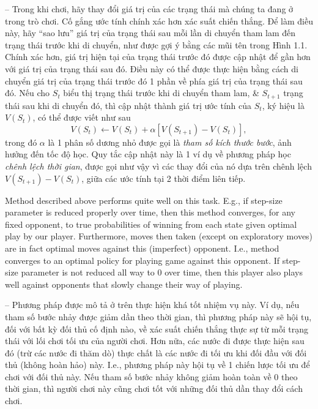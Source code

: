 \documentclass{article}
\begin{document}
\begin{itemize}
\begin{itemize}
        -- Trong khi chơi, hãy thay đổi giá trị của các trạng thái mà chúng ta đang ở trong trò chơi. Cố gắng ước tính chính xác hơn xác suất chiến thắng. Để làm điều này, hãy ``sao lưu'' giá trị của trạng thái sau mỗi lần di chuyển tham lam đến trạng thái trước khi di chuyển, như được gợi ý bằng các mũi tên trong Hình 1.1. Chính xác hơn, giá trị hiện tại của trạng thái trước đó được cập nhật để gần hơn với giá trị của trạng thái sau đó. Điều này có thể được thực hiện bằng cách di chuyển giá trị của trạng thái trước đó 1 phần về phía giá trị của trạng thái sau đó. Nếu cho $S_t$ biểu thị trạng thái trước khi di chuyển tham lam, \& $S_{t+1}$ trạng thái sau khi di chuyển đó, thì cập nhật thành giá trị ước tính của $S_t$, ký hiệu là $V(S_t)$, có thể được viết như sau
        \begin{equation*}
            V(S_t)\leftarrow V(S_t) + \alpha[V(S_{t+1}) - V(S_t)],
        \end{equation*}
        trong đó $\alpha$ là 1 phân số dương nhỏ được gọi là {\it tham số kích thước bước}, ảnh hưởng đến tốc độ học. Quy tắc cập nhật này là 1 ví dụ về phương pháp học {\it chênh lệch thời gian}, được gọi như vậy vì các thay đổi của nó dựa trên chênh lệch $V(S_{t+1}) - V(S_t)$, giữa các ước tính tại 2 thời điểm liên tiếp.

        Method described above performs quite well on this task. E.g., if step-size parameter is reduced properly over time, then this method converges, for any fixed opponent, to true probabilities of winning from each state given optimal play by our player. Furthermore, moves then taken (except on exploratory  moves) are in fact optimal moves against this (imperfect) opponent. I.e., method converges to an optimal policy for playing game against this opponent. If step-size parameter is not reduced all way to 0 over time, then this player also plays well against opponents that slowly change their way of playing.

        -- Phương pháp được mô tả ở trên thực hiện khá tốt nhiệm vụ này. Ví dụ, nếu tham số bước nhảy được giảm dần theo thời gian, thì phương pháp này sẽ hội tụ, đối với bất kỳ đối thủ cố định nào, về xác suất chiến thắng thực sự từ mỗi trạng thái với lối chơi tối ưu của người chơi. Hơn nữa, các nước đi được thực hiện sau đó (trừ các nước đi thăm dò) thực chất là các nước đi tối ưu khi đối đầu với đối thủ (không hoàn hảo) này. I.e., phương pháp này hội tụ về 1 chiến lược tối ưu để chơi với đối thủ này. Nếu tham số bước nhảy không giảm hoàn toàn về 0 theo thời gian, thì người chơi này cũng chơi tốt với những đối thủ dần thay đổi cách chơi.


\end{itemize}
\end{itemize}
\end{document}
